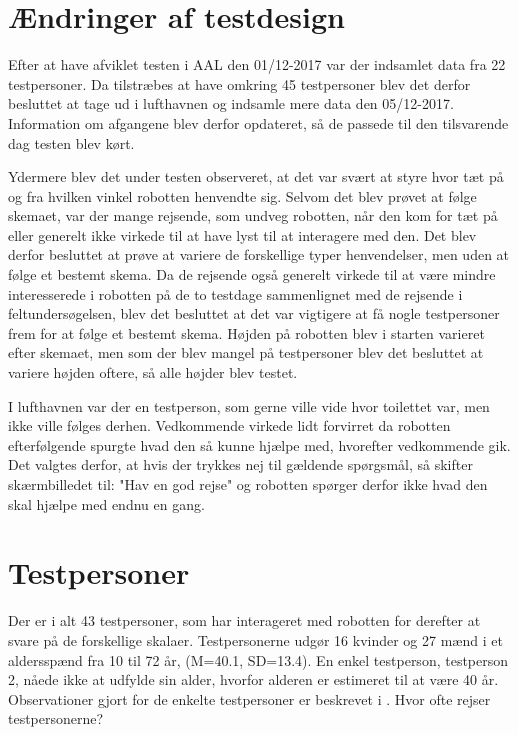 \section{Ændringer af testdesign}
\label{TestAfSkalaerAendringerTD}
%
Efter at have afviklet testen i AAL den 01/12-2017 var der indsamlet data fra 22 testpersoner. Da tilstræbes at have omkring 45 testpersoner blev det derfor besluttet at tage ud i lufthavnen og indsamle mere data den 05/12-2017. Information om afgangene blev derfor opdateret, så de passede til den tilsvarende dag testen blev kørt. 

Ydermere blev det under testen observeret, at det var svært at styre hvor tæt på og fra hvilken vinkel robotten henvendte sig. Selvom det blev prøvet at følge skemaet, var der mange rejsende, som undveg robotten, når den kom for tæt på eller generelt ikke virkede til at have lyst til at interagere med den. Det blev derfor besluttet at prøve at variere de forskellige typer henvendelser, men uden at følge et bestemt skema. Da de rejsende også generelt virkede til at være mindre interesserede i robotten på de to testdage sammenlignet med de rejsende i feltundersøgelsen, blev det besluttet at det var vigtigere at få nogle testpersoner frem for at følge et bestemt skema. Højden på robotten blev i starten varieret efter skemaet, men som der blev mangel på testpersoner blev det besluttet at variere højden oftere, så alle højder blev testet.

I lufthavnen var der en testperson, som gerne ville vide hvor toilettet var, men ikke ville følges derhen. Vedkommende virkede lidt forvirret da robotten efterfølgende spurgte hvad den så kunne hjælpe med, hvorefter vedkommende gik. Det valgtes derfor, at hvis der trykkes nej til gældende spørgsmål, så skifter skærmbilledet til: "Hav en god rejse" og robotten spørger derfor ikke hvad den skal hjælpe med endnu en gang.

\section{Testpersoner}
\label{ParametreFaktiskeTestpersoner}
%
Der er i alt 43 testpersoner, som har interageret med robotten for derefter at svare på de forskellige skalaer. Testpersonerne udgør 16 kvinder og 27 mænd i et aldersspænd fra 10 til 72 år, (M=40.1, SD=13.4). En enkel testperson, testperson 2, nåede ikke at udfylde sin alder, hvorfor alderen er estimeret til at være 40 år. Observationer gjort for de enkelte testpersoner er beskrevet i .\blankline 
%
Hvor ofte rejser testpersonerne?